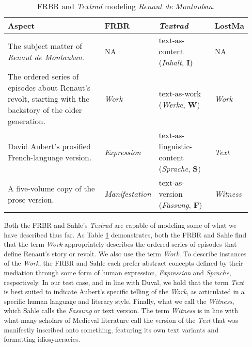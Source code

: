 \begin{table}[ht]
    \begin{center}
    \begin{tabular}{|p{}|p{}|p{}|p{}|}
        \hline
        \textbf{Aspect} & \textbf{FRBR} & \textbf{\textit{Textrad}} & \textbf{LostMa} \\ \hline
        The subject matter of \textit{Renaut de Montauban}. & NA & text-as-content \newline (\textit{Inhalt}, \textbf{I}) & NA \\ \hline
        The ordered series of episodes about Renaut's revolt, starting with the backstory of the older generation. & \textit{Work} & text-as-work \newline (\textit{Werke}, \textbf{W}) & \textit{Work} \\ \hline
        David Aubert's prosified French-language version. & \textit{Expression} & text-as-linguistic-content \newline (\textit{Sprache}, \textbf{S}) & \textit{Text} \\ \hline
        A five-volume copy of the prose version. & \textit{Manifestation} & text-as-version \newline (\textit{Fassung}, \textbf{F}) & \textit{Witness} \\ \hline
    \end{tabular}
    \end{center}
\caption{FRBR and \textit{Textrad} modeling \textit{Renaut de Montauban}.}
\label{tab:Renaut}
\end{table}

Both the FRBR and Sahle's \textit{Textrad} are capable of modeling some of what we have described thus far. As Table \ref{tab:Renaut} demonstrates, both the FRBR and Sahle find that the term \textit{Work} appropriately describes the ordered series of episodes that define Renaut's story or revolt. We also use the term \textit{Work}. To describe instances of the \textit{Work}, the FRBR and Sahle each prefer abstract concepts defined by their mediation through some form of human expression, \textit{Expression} and \textit{Sprache}, respectively. In our test case, and in line with Duval, we hold that the term \textit{Text} is best suited to indicate Aubert's specific telling of the \textit{Work}, as articulated in a specific human language and literary style. Finally, what we call the \textit{Witness}, which Sahle calls the \textit{Fassung} or text version. The term \textit{Witness} is in line with what many scholars of Medieval literature call the version of the \textit{Text} that was manifestly inscribed onto something, featuring its own text variants and formatting idiosyncracies.

